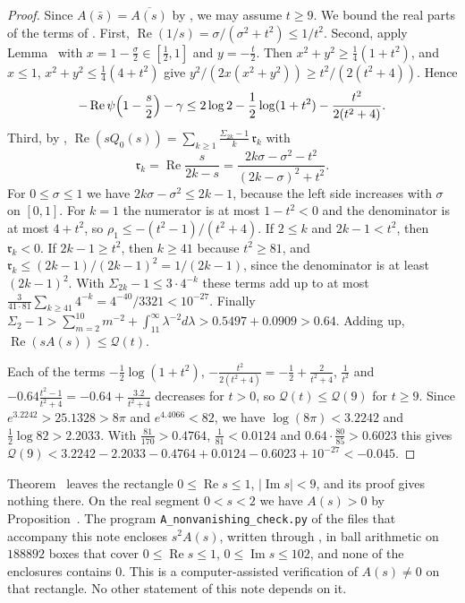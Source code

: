\begin{proof}
Since $A(\bar s)=\overline{A(s)}$ by , we may assume $t\ge9$. We bound the real parts of the terms of . First, $\operatorname{Re}(1/s)=\sigma/(\sigma^2+t^2)\le1/t^2$. Second, apply Lemma~ with $x=1-\frac\sigma2\in[\frac12,1]$ and $y=-\frac t2$. Then $x^2+y^2\ge\frac14(1+t^2)$, and $x\le1$, $x^2+y^2\le\frac14(4+t^2)$ give $y^2/(2x(x^2+y^2))\ge t^2/(2(t^2+4))$. Hence
\begin{equation}\label{eq:psibound}
-\operatorname{Re}\psi\Bigl(1-\frac s2\Bigr)-\gamma\le2\log2-\frac12\log(1+t^2)-\frac{t^2}{2(t^2+4)} .
\end{equation}
Third, by , $\operatorname{Re}(sQ_0(s))=\sum_{k\ge1}\frac{\Sigma_{2k}-1}k\,\mathfrak r_k$ with
\begin{equation}\label{eq:rhok}
\mathfrak r_k=\operatorname{Re}\frac{s}{2k-s}=\frac{2k\sigma-\sigma^2-t^2}{(2k-\sigma)^2+t^2} .
\end{equation}
For $0\le\sigma\le1$ we have $2k\sigma-\sigma^2\le2k-1$, because the left side increases with $\sigma$ on $[0,1]$. For $k=1$ the numerator is at most $1-t^2<0$ and the denominator is at most $4+t^2$, so $\rho_1\le-(t^2-1)/(t^2+4)$. If $2\le k$ and $2k-1<t^2$, then $\mathfrak r_k<0$. If $2k-1\ge t^2$, then $k\ge41$ because $t^2\ge81$, and $\mathfrak r_k\le(2k-1)/(2k-1)^2=1/(2k-1)$, since the denominator is at least $(2k-1)^2$. With $\Sigma_{2k}-1\le3\cdot4^{-k}$ these terms add up to at most $\frac{3}{41\cdot81}\sum_{k\ge41}4^{-k}=4^{-40}/3321<10^{-27}$. Finally $\Sigma_2-1>\sum_{m=2}^{10}m^{-2}+\int_{11}^\infty\lambda^{-2}d\lambda>0.5497+0.0909>0.64$. Adding up, $\operatorname{Re}(sA(s))\le\mathcal Q(t)$.

Each of the terms $-\frac12\log(1+t^2)$, $-\frac{t^2}{2(t^2+4)}=-\frac12+\frac2{t^2+4}$, $\frac1{t^2}$ and $-0.64\frac{t^2-1}{t^2+4}=-0.64+\frac{3.2}{t^2+4}$ decreases for $t>0$, so $\mathcal Q(t)\le\mathcal Q(9)$ for $t\ge9$. Since $e^{3.2242}>25.1328>8\pi$ and $e^{4.4066}<82$, we have $\log(8\pi)<3.2242$ and $\frac12\log82>2.2033$. With $\frac{81}{170}>0.4764$, $\frac1{81}<0.0124$ and $0.64\cdot\frac{80}{85}>0.6023$ this gives $\mathcal Q(9)<3.2242-2.2033-0.4764+0.0124-0.6023+10^{-27}<-0.045$.
\end{proof}

\begin{remark}\label{rem:Acert}
Theorem~ leaves the rectangle $0\le\operatorname{Re}s\le1$, $|\operatorname{Im}s|<9$, and its proof gives nothing there. On the real segment $0<s<2$ we have $A(s)>0$ by Proposition~. The program \texttt{A\_nonvanishing\_check.py} of the files that accompany this note encloses $s^2A(s)$, written through , in ball arithmetic \cite{Johansson2017} on $188892$ boxes that cover $0\le\operatorname{Re}s\le1$, $0\le\operatorname{Im}s\le102$, and none of the enclosures contains $0$. This is a computer-assisted verification of $A(s)\ne0$ on that rectangle. No other statement of this note depends on it.
\end{remark}

